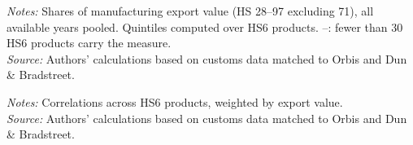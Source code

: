 \documentclass[11pt,a4paper]{article}
\begin{document}
\begin{table}[H]\centering\small%
  \caption{Manufacturing: Multinational Share of Export Value, by Quintile of Six Sophistication Measures}%
  \label{tab:six_t_manufacturing}%
  \par\vspace{3pt}%
  \begin{minipage}{0.95\textwidth}\footnotesize %
  \textit{Notes:} Shares of manufacturing export value (HS 28--97 excluding 71), all available years pooled. Quintiles computed over HS6 products. --: fewer than 30 HS6 products carry the measure.\\[3pt]%
  \textit{Source:} Authors' calculations based on customs data matched to Orbis and Dun \& Bradstreet.%
  \end{minipage}%
  \end{table}
\begin{table}[H]\centering\small%
  \caption{Manufacturing: Correlations between Sophistication Measures}%
  \label{tab:corr_manufacturing}%
  \par\vspace{3pt}%
  \begin{minipage}{0.95\textwidth}\footnotesize %
  \textit{Notes:} Correlations across HS6 products, weighted by export value.\\[3pt]%
  \textit{Source:} Authors' calculations based on customs data matched to Orbis and Dun \& Bradstreet.%
  \end{minipage}%
  \end{table}
\end{document}
